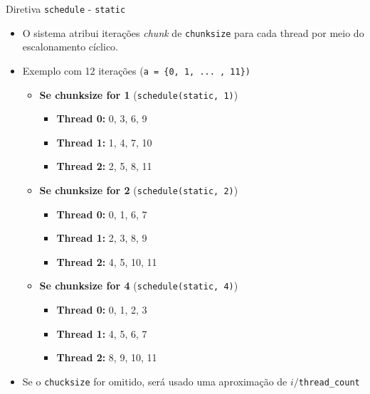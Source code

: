 	
	\begin{frame}{Diretiva {\tt schedule} - {\tt static}}
		\begin{itemize}
			\item O sistema atribui iterações \textit{chunk} de {\tt chunksize} para cada thread por meio do escalonamento cíclico.
					\bigskip
			\item Exemplo com 12 iterações ({\tt a = \{0, 1, ... , 11\})}
					\pause
			\begin{itemize}
				\setlength\itemsep{0.5em}
				\item \textbf{Se chunksize for 1} ({\tt schedule(static, 1)})
				\begin{itemize}
					\setlength\itemsep{0.3em}
					\item \textbf{Thread 0:} 0, 3, 6, 9
					\item \textbf{Thread 1:} 1, 4, 7, 10
					\item \textbf{Thread 2:} 2, 5, 8, 11
				\end{itemize}
						\pause
				\item \textbf{Se chunksize for 2} ({\tt schedule(static, 2)})
				\begin{itemize}
					\setlength\itemsep{0.3em}
					\item \textbf{Thread 0:} 0, 1, 6, 7
					\item \textbf{Thread 1:} 2, 3, 8, 9
					\item \textbf{Thread 2:} 4, 5, 10, 11
				\end{itemize}
						\pause 
				\item \textbf{Se chunksize for 4} ({\tt schedule(static, 4)})
				\begin{itemize}
					\setlength\itemsep{0.3em}
					\item \textbf{Thread 0:} 0, 1, 2, 3
					\item \textbf{Thread 1:} 4, 5, 6, 7
					\item \textbf{Thread 2:} 8, 9, 10, 11
				\end{itemize}
			\end{itemize}
			\item Se o {\tt chucksize} for omitido, será usado uma aproximação de $i/${\tt thread\_count}
		\end{itemize}
	\end{frame}

